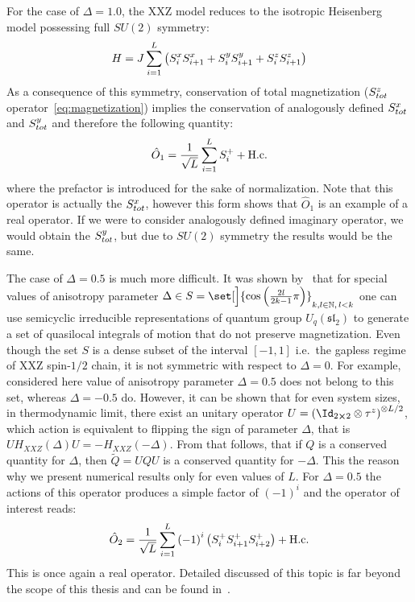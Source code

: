 For the case of \(\Delta=1.0\), the XXZ model reduces to the isotropic Heisenberg model possessing full
\(SU(2)\) symmetry:
\begin{equation}
  H = J \sum_{i=1}^L \left(S^{x}_i S^{x}_{i+1} + S^{y}_i S^{y}_{i+1} + S^{z}_i S^{z}_{i+1}\right)
\end{equation}
As a consequence of this symmetry, conservation of total magnetization 
(\(S^{z}_{tot}\) operator~\eqref{eq:magnetization}) implies the conservation of analogously defined \(S^{x}_{tot}\)
and \(S^{y}_{tot}\) and therefore the following quantity:
\begin{equation}
    \hat{O}_{1} =  \frac{1}{\sqrt{L}}\sum_{i=1}^{L} S^{+}_{i} + \text{H.c.}
    \label{eq:delta 1.0}
\end{equation}
where the prefactor is introduced for the sake of normalization. Note that
this operator is actually the \(S^{x}_{tot}\), however this form shows that \(\hat{O}_1\) 
is an example of a real operator. If we were to consider analogously defined imaginary operator,
we would obtain the \(S^{y}_{tot}\), but due to \(SU(2)\) symmetry the results would be the same.


The case of \(\Delta=0.5\) is much more difficult. It was shown by~\textcite{zadnik2016} that for 
special values of anisotropy parameter \(\Delta \in S = \set[\Big]{\cos\left(\frac{2l}{2k-1}
\pi\right)}_{k,l\in \NN,\, l<k}\) one can use semicyclic irreducible representations
of quantum group \(U_q(\mathfrak{sl}_2)\) to generate a set of quasilocal integrals of 
motion that do not preserve magnetization. Even though the set \(S\) is a dense subset
of the interval \([-1,1]\) i.e.\ the gapless regime of XXZ spin-\(1/2\) chain, it is not
symmetric with respect to \(\Delta=0\). For example, considered here value of anisotropy parameter
\(\Delta=0.5\) does not belong to this set, whereas \(\Delta=-0.5\) do. However, it can be shown
that for even system sizes, in thermodynamic limit, there exist an unitary operator 
\(U = \left(\Id_{2\cross 2}\otimes \tau^z\right)^{\otimes L/2}\), which action is equivalent to flipping the sign 
of parameter \(\Delta\), that is \(UH_{XXZ}(\Delta)U = -H_{XXZ}(-\Delta)\). From that follows,
that if \(Q\) is a conserved quantity for \(\Delta\), then \(\tilde{Q} = UQU\) is a conserved
quantity for \(-\Delta\). This the reason why we present numerical results only for even 
values of \(L\). For \(\Delta=0.5\) the actions
of this operator produces a simple factor of \((-1)^i\) and the operator of interest reads:
\begin{equation}
  \hat{O}_{2} =\frac{1}{\sqrt{L}} \sum_{i=1}^{L} {(-1)}^i \left( S^{+}_{i}S^{+}_{i+1}S^{+}_{i+2}\right) + \text{H.c.}
  \label{eq:delta 0.5}
\end{equation}  
This is once again a real operator. Detailed discussed of this topic is far beyond the scope of this thesis
and can be found in~\autocite{zadnik2016,Prosen2014c}.

